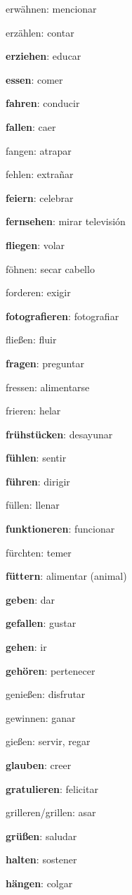 \begin{multicols}{2}
\begin{myitemize}
\item erwähnen: mencionar
\item erzählen: contar
\item \textbf{erziehen}: educar
\item \textbf{essen}: comer
\item \textbf{fahren}: conducir
\item \textbf{fallen}: caer
\item fangen: atrapar
\item fehlen: extrañar
\item \textbf{feiern}: celebrar
\item \textbf{fernsehen}: mirar televisión
\item \textbf{fliegen}: volar
\item föhnen: secar cabello
\item forderen: exigir
\item \textbf{fotografieren}: fotografiar
\item fließen: fluir
\item \textbf{fragen}: preguntar
\item fressen: alimentarse
\item frieren: helar
\item \textbf{frühstücken}: desayunar
\item \textbf{fühlen}: sentir
\item \textbf{führen}: dirigir
\item füllen: llenar
\item \textbf{funktioneren}: funcionar
\item fürchten: temer
\item \textbf{füttern}: alimentar (animal)
\item \textbf{geben}: dar
\item \textbf{gefallen}: gustar
\item \textbf{gehen}: ir
\item \textbf{gehören}: pertenecer
\item genießen: disfrutar
\item gewinnen: ganar
\item gießen: servir, regar
\item \textbf{glauben}: creer
\item \textbf{gratulieren}: felicitar
\item grilleren/grillen: asar
\item \textbf{grüßen}: saludar
\item \textbf{halten}: sostener
\item \textbf{hängen}: colgar

\end{myitemize}
\end{multicols}

